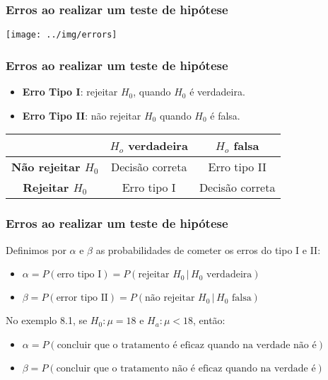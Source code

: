 \documentclass{beamer}
\begin{document}
\begin{frame}
\frametitle{Erros ao realizar um teste de hipótese}

\begin{center}\texttt{[image: ../img/errors]} \end{center}
\end{frame}

\begin{frame}
\frametitle{Erros ao realizar um teste de hipótese}

\begin{itemize}
\item
  \textbf{Erro Tipo I}: rejeitar \(H_0\), quando \(H_0\) é verdadeira.
\item
  \textbf{Erro Tipo II}: não rejeitar \(H_0\) quando \(H_0\) é falsa.
\end{itemize}

\begin{table}[h]
\centering
\begin{tabular}{c|cc}
\hline
& \textbf{$H_o$ verdadeira} & \textbf{$H_o$ falsa} \\
\hline
\textbf{Não rejeitar $H_0$} & Decisão correta & Erro tipo II \\
\textbf{Rejeitar $H_0$} & Erro tipo I & Decisão correta \\
\hline
\end{tabular}
\end{table}
\end{frame}

\begin{frame}
\frametitle{Erros ao realizar um teste de hipótese}

Definimos por \(\alpha\) e \(\beta\) as probabilidades de cometer os
erros do tipo I e II:

\begin{itemize}
\item
  \(\alpha = P(\text{erro tipo I}) = P(\text{rejeitar } H_0 \, | \, H_0 \text{ verdadeira})\)
\item
  \(\beta = P(\text{error tipo II}) = P(\text{não rejeitar } H_0 \, | \, H_0 \text{ falsa})\)
\end{itemize}

No exemplo 8.1, se \(H_0: \mu = 18\) e \(H_a: \mu < 18\), então:

\begin{itemize}
\item
  \(\alpha = P(\text{concluir que o tratamento é eficaz quando na verdade não é})\)
\item
  \(\beta = P(\text{concluir que o tratamento não é eficaz quando na verdade é})\)
\end{itemize}
\end{frame}
\end{document}
